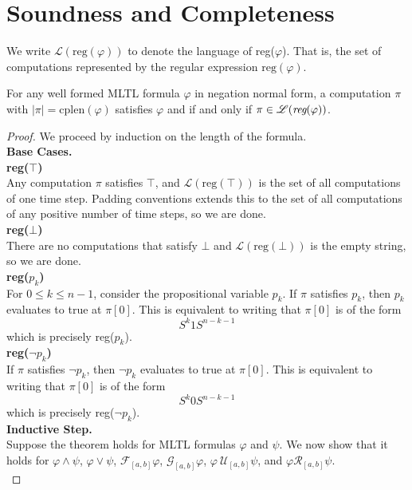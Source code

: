 \documentclass[runningheads]{llncs}
\renewcommand{\phi}{\varphi}
\begin{document}
 \section{Soundness and Completeness} \label{Appendix-SoundComplete}
 We write $\mathscr{L}(\text{reg}(\phi))$ to denote the language of reg($\phi$). That is, the set of computations represented by the regular expression $\text{reg}(\phi)$.
\begingroup
\renewcommand\thetheorem{2}
 \begin{theorem}
 For any well formed MLTL formula $\phi$ in negation normal form, a computation $\pi$ with $|\pi| = \text{cplen}(\phi)$ satisfies $\phi$ and  if and only if $\pi \in \mathscr{L}(\emph{reg}(\phi))$.
\end{theorem}
\endgroup
 \begin{proof}
 We proceed by induction on the length of the formula.\\
 \noindent \textbf{Base Cases.}\\
 \noindent\textbf{reg($\top$)}\\
 Any computation $\pi$ satisfies $\top$, and $\mathscr{L}(\text{reg}(\top))$ is the set of all computations of one time step. Padding conventions extends this to the set of all computations of any positive number of time steps, so we are done.\\
 \noindent\textbf{reg($\bot$)}\\
 There are no computations that satisfy $\bot$ and $\mathscr{L}(\text{reg}(\bot))$ is the empty string, so we are done.\\
 \noindent\textbf{reg($p_k$)}\\
 For $0\leq k \leq n-1$, consider the propositional variable $p_k$. If $\pi$ satisfies $p_k$, then $p_k$ evaluates to true at $\pi[0]$. This is equivalent to writing that $\pi[0]$ is of the form 
 $$S^{k} 1 S^{n-k-1}$$
 which is precisely reg($p_k$).\\
 \noindent\textbf{reg($\neg p_k$)}\\
 If $\pi$ satisfies $\neg p_k$, then $\neg p_k$ evaluates to true at $\pi[0]$. This is equivalent to writing that $\pi[0]$ is of the form 
 $$S^{k} 0 S^{n-k-1}$$
 which is precisely reg($\neg p_k$).\\
 \noindent\textbf{Inductive Step.}\\
 Suppose the theorem holds for MLTL formulas $\varphi$ and $\psi$. We now show that it holds for $\varphi \land \psi$, $\varphi \lor \psi$, $\mathcal{F}_{[a,b]} \varphi$, $\mathcal{G}_{[a,b]} \varphi$, $\varphi \ \mathcal{U}_{[a,b]} \psi$, and $\varphi \mathcal{R}_{[a,b]} \psi$.\\

\end{proof}
\end{document}
